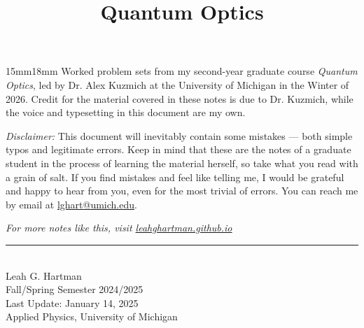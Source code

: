 \documentclass[a4paper,11pt]{article}
\title{Quantum Optics \vspace{-2.5em}}
\date{}
\begin{document}
  \maketitle
  \thispagestyle{empty}

  \begin{adjustwidth}{15mm}{18mm}
    \hspace{1.4em} Worked problem sets from my second-year graduate course \textit{Quantum Optics}, led by Dr. Alex Kuzmich at the University of Michigan in the Winter of 2026. Credit for the material covered in these notes is due to Dr. Kuzmich, while the voice and typesetting in this document are my own.

    \hspace{1.4em} \textit{Disclaimer:} This document will inevitably contain some mistakes ---  both simple typos and legitimate errors. Keep in mind that these are the notes of a graduate student in the process of learning the material herself, so take what you read with a grain of salt. If you find mistakes and feel like telling me, I would be grateful and happy to hear from you, even for the most trivial of errors. You can reach me by email at \href{mailto:lghart@umich.edu}{lghart@umich.edu}.
  \end{adjustwidth}

\vspace{12cm}

  \begin{center}
    \textit{For more notes like this, visit \href{https://leahghartman.github.io/academics/}{leahghartman.github.io}}
    \rule{0.75\textwidth}{0.5pt} \\
    Leah G. Hartman \\
    Fall/Spring Semester 2024/2025 \\
    Last Update: January 14, 2025 \\
    Applied Physics, University of Michigan 
  \end{center}

  \newpage
  \tableofcontents

  \clearpage
  \newpage


  

\end{document}
